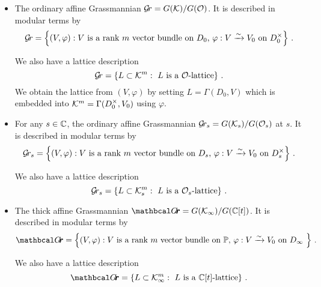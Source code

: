 \documentclass[draft]{article}
\begin{document}
\begin{itemize}
    \item The ordinary affine Grassmannian $\mathcal{G}\!r = G(\mathcal K)/G(\mathcal O)$. It is described in modular terms by 
    $$
    \mathcal{G}\!r = \left\{ (V, \varphi) : \text{$V$ is a rank $m$ vector bundle on $ D_0 $, $\varphi : V \xrightarrow{\sim} V_0 $ on $ D_0^\times $} \right\} \,. 
    $$
    
    We also have a lattice description 
    $$ 
    \mathcal{G}\!r = \left\{ L \subset \mathcal K^m : \text{ $L$ is a $\mathcal O$-lattice} \right\}\,.
    $$
    We obtain the lattice from $ (V,\varphi) $ by setting $ L = \Gamma(D_0, V)$ which is embedded into $ \mathcal K^m = \Gamma(D_0^\times, V_0)$ using $ \varphi$.
    \item For any $ s \in \mathbb C $, 
    the ordinary affine Grassmannian $\mathcal{G}\!r_s = G(\mathcal K_s)/G(\mathcal O_s)$ at $ s $. It is described in modular terms by
    $$
    \mathcal{G}\!r_s = \left\{ (V, \varphi) : \text{$V$ is a rank $m$ vector bundle on $ D_s $, $\varphi : V \xrightarrow{\sim} V_0 $ on $ D^\times_s $} \right\}\,.
    $$

    We also have a lattice description 
    $$ 
    \mathcal{G}\!r_s = \left\{ L \subset \mathcal K_s^m : \text{ $L$ is a $\mathcal O_s$-lattice} \right\} \,. 
    $$   
    \item The thick affine Grassmannian $\Grth = G(\Kinf)/G(\CC[t])$. %
    It is described in modular terms by
    $$
        \Grth = \left\{ (V, \varphi) : \text{$V$ is a rank $m$ vector bundle on $ \PP $, $\varphi : V \xrightarrow{\sim} V_0 $ on $ D_\infty $ } \right\}\,. %
    $$
    
    We also have a lattice description 
    $$ 
    \Grth = \left\{ L \subset  \Kinf^m : \text{ $L$ is a $\CC[t]$-lattice} \right\}\,.
    $$ %
    


\end{itemize}
\end{document}
